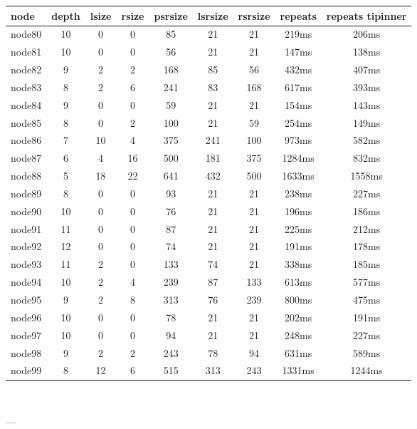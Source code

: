 \begin{tabular}{|l|c|c|c|c|c|c|c|c|}
\hline node & depth & lsize & rsize & psrsize & lsrsize & rsrsize   & repeats & repeats tipinner\\
    \hline node80 & 10 & 0 & 0 & 85 & 21 & 21 & 219ms & 206ms\\
    \hline node81 & 10 & 0 & 0 & 56 & 21 & 21 & 147ms & 138ms\\
    \hline node82 & 9 & 2 & 2 & 168 & 85 & 56 & 432ms & 407ms\\
    \hline node83 & 8 & 2 & 6 & 241 & 83 & 168 & 617ms & 393ms\\
    \hline node84 & 9 & 0 & 0 & 59 & 21 & 21 & 154ms & 143ms\\
    \hline node85 & 8 & 0 & 2 & 100 & 21 & 59 & 254ms & 149ms\\
    \hline node86 & 7 & 10 & 4 & 375 & 241 & 100 & 973ms & 582ms\\
    \hline node87 & 6 & 4 & 16 & 500 & 181 & 375 & 1284ms & 832ms\\
    \hline node88 & 5 & 18 & 22 & 641 & 432 & 500 & 1633ms & 1558ms\\
    \hline node89 & 8 & 0 & 0 & 93 & 21 & 21 & 238ms & 227ms\\
    \hline node90 & 10 & 0 & 0 & 76 & 21 & 21 & 196ms & 186ms\\
    \hline node91 & 11 & 0 & 0 & 87 & 21 & 21 & 225ms & 212ms\\
    \hline node92 & 12 & 0 & 0 & 74 & 21 & 21 & 191ms & 178ms\\
    \hline node93 & 11 & 2 & 0 & 133 & 74 & 21 & 338ms & 185ms\\
    \hline node94 & 10 & 2 & 4 & 239 & 87 & 133 & 613ms & 577ms\\
    \hline node95 & 9 & 2 & 8 & 313 & 76 & 239 & 800ms & 475ms\\
    \hline node96 & 10 & 0 & 0 & 78 & 21 & 21 & 202ms & 191ms\\
    \hline node97 & 10 & 0 & 0 & 94 & 21 & 21 & 248ms & 227ms\\
    \hline node98 & 9 & 2 & 2 & 243 & 78 & 94 & 631ms & 589ms\\
    \hline node99 & 8 & 12 & 6 & 515 & 313 & 243 & 1331ms & 1244ms\\

\hline
\end{tabular} \

---


